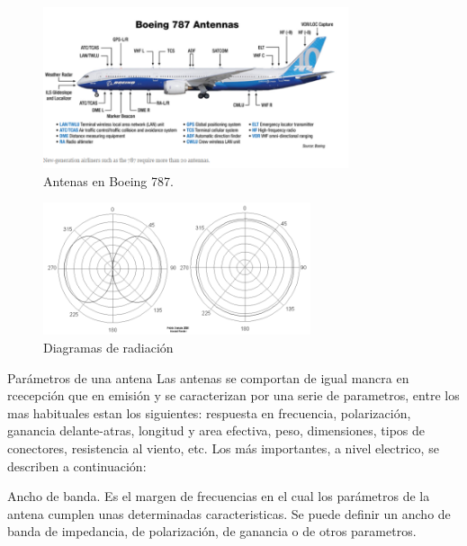  \begin{figure}[!h]
    \centering
  \includegraphics[width=0.8\textwidth]{06.radionavegacion/Imagenes/06.00.ondas.electromagneticas/787-antenas.png}  
    \caption{Antenas en Boeing 787. \protect\cite{Boeing787_antenas}}
      \label{fig:06.antenas.boeing.787}
  \end{figure}



\begin{figure}[!h]
  \centering
  \includegraphics[width=0.7\textwidth]{06.radionavegacion/Imagenes/06.01.adf/diagramas-radiacion.png}
  \caption{Diagramas de radiaci\'on \protect\cite{wikipedia_esp}}
  \label{fig:diagramas-radiacion}
\end{figure}

Parámetros de una antena
Las antenas se comportan de igual mancra en rcecepción que en emisión y se caracterizan por una serie de parametros,
entre los mas habituales estan los siguientes:
respuesta en frecuencia,
polarización,
ganancia delante-atras,
longitud y area efectiva,
peso,
dimensiones,
tipos de conectores,
resistencia al viento, etc. \cite{moyacomunicaciones}
Los más importantes, a nivel electrico, se describen a continuación:

Ancho de banda. Es el margen de frecuencias en el cual los parámetros de la antena cumplen unas determinadas caracteristicas. Se puede deﬁnir un ancho de banda de impedancia, de polarización, de ganancia o de otros parametros.

